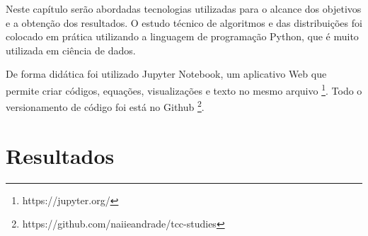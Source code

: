 Neste capítulo serão abordadas tecnologias utilizadas para o alcance dos objetivos e a obtenção dos resultados. O estudo técnico de algoritmos e das distribuições foi colocado em prática utilizando a linguagem de programação Python, que é muito utilizada em ciência de dados.

De forma didática foi utilizado Jupyter Notebook, um aplicativo Web que permite criar códigos, equações, visualizações e texto no mesmo arquivo \footnote{https://jupyter.org/}. Todo o versionamento de código foi está no Github \footnote{https://github.com/naiieandrade/tcc-studies}.



\section{Resultados}


